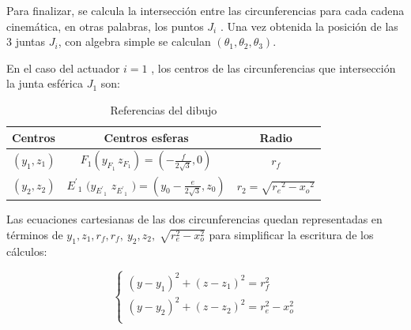                 \newpage

        Para finalizar, se calcula la intersecci\'{o}n entre las circunferencias para cada cadena cinem\'{a}tica, en otras palabras, los puntos  $J_i$ . Una vez obtenida la posici\'{o}n de las 3 juntas $J_i$, con algebra simple se calculan $\left({\theta }_1,{\theta }_2,{\theta }_3\right)$.
        
        En el caso del actuador  $i=1$ , los centros de las circunferencias que intersección la junta esf\'{e}rica $J_1$ son:
        
        \begin{center}
        \renewcommand{\arraystretch}{2.5}
        
            \begin{table}[H]
            \centering
            \begin{tabular}{p{1.4cm} c c } 
                 \hline
                 \textbf{Centros}  &  \textbf{Centros esferas}  & \textbf{Radio} \\ [0.1ex] 
                 \hline\hline
                         $\left(y_1,z_1\right)$ &
                        $F_1\left(y_{F_1}\,z_{F_1}\right)=\left(-\frac{f}{2\sqrt{3}},0\right)$\textit{} & 
                                                 $r_f$  \\ 
                \hline
                          $(y_2,z_2)$&
                          ${E^'}_{1}$ $(y_{{E^'}_1}$ $z_{{E^'}_1}$ $)=(y_0-\frac{e}{2\sqrt{3}},z_0)$ &
                          $r_2=\sqrt{{r_e}^2-{x_o}^2}$ \\
                \hline
            \end{tabular}
            \caption{Referencias del dibujo}
            \label{tab:cap4_tabla_4}
            \end{table}
        \end{center}
    \vspace{-2.5em}
        
Las ecuaciones cartesianas de las dos circunferencias quedan representadas en términos de  $y_{1},z_{1},r_{f},r_{f},~y_{2},z_{2},\sqrt[]{r_{e}^{2}-x_{o}^{2}}$ para simplificar la escritura de los cálculos:

    \begin{equation}
    \left\lbrace
    \begin{array}{ll}
    \left( y-y_{1} \right) ^{2} + \left( z-z_{1} \right) ^{2}= r_{f}^{2}~\\
    \left( y-y_{2} \right) ^{2} + \left( z-z_{2} \right) ^{2}= r_{e}^{2}-x_{o}^{2}\\ 
    \end{array}
    \right.
    \label{eq:cap4_eq_15}
    \end{equation}

